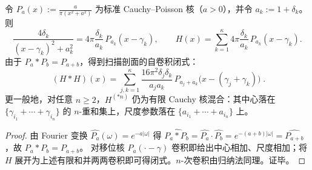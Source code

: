 \begin{proposition}\label{prop:xi-basepoint-scan-cauchy-stable-convolution}
令 \(P_a(x):=\frac{a}{\pi(x^2+a^2)}\) 为标准 Cauchy--Poisson 核（\(a>0\)），并令 \(a_k:=1+\delta_k\)。
则
\[
\frac{4\delta_k}{(x-\gamma_k)^2+a_k^2}
=4\pi\frac{\delta_k}{a_k}\,P_{a_k}(x-\gamma_k),
\qquad
H(x)=\sum_{k=1}^{\kappa}4\pi\frac{\delta_k}{a_k}\,P_{a_k}(x-\gamma_k).
\]
由于 \(P_a*P_b=P_{a+b}\)，得到扫描剖面的自卷积闭式：
\[
\boxed{\;
(H*H)(x)=
\sum_{j,k=1}^{\kappa}\frac{16\pi^{2}\delta_j\delta_k}{a_ja_k}\,
P_{a_j+a_k}\bigl(x-(\gamma_j+\gamma_k)\bigr)\; }.
\]
更一般地，对任意 \(n\ge 2\)，\(H^{(*n)}\) 仍为有限 Cauchy 核混合：其中心落在 \(\{\gamma_{i_1}+\cdots+\gamma_{i_n}\}\) 的 \(n\)-重和集上，尺度参数落在 \(\{a_{i_1}+\cdots+a_{i_n}\}\) 上。
\end{proposition}
\begin{proof}
由 Fourier 变换 \(\widehat{P_a}(\omega)=e^{-a|\omega|}\) 得
\(
\widehat{P_a*P_b}=\widehat{P_a}\cdot\widehat{P_b}=e^{-(a+b)|\omega|}=\widehat{P_{a+b}}
\)，故 \(P_a*P_b=P_{a+b}\)。
对移位核 \(P_a(\cdot-\gamma)\) 卷积即给出中心相加、尺度相加；将 \(H\) 展开为上述有限和并两两卷积即可得闭式。\(n\)-次卷积由归纳法同理。证毕。
\end{proof}

\endinput
